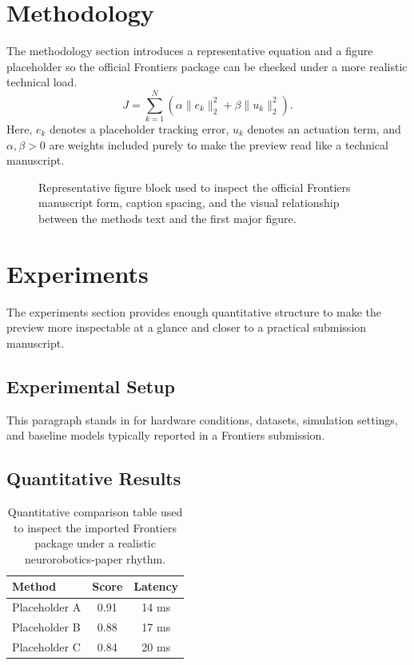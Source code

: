 \documentclass[utf8]{FrontiersinHarvard}
\begin{document}
\section{Methodology}
The methodology section introduces a representative equation and a figure placeholder so the official Frontiers package can be checked under a more realistic technical load.
\begin{equation}
J = \sum_{k=1}^{N} \left( \alpha \lVert e_k \rVert_2^2 + \beta \lVert u_k \rVert_2^2 \right).
\end{equation}
Here, $e_k$ denotes a placeholder tracking error, $u_k$ denotes an actuation term, and $\alpha,\beta > 0$ are weights included purely to make the preview read like a technical manuscript.
\begin{figure}[h]
\centering
{}
\caption{Representative figure block used to inspect the official Frontiers manuscript form, caption spacing, and the visual relationship between the methods text and the first major figure.}
\end{figure}
\section{Experiments}
The experiments section provides enough quantitative structure to make the preview more inspectable at a glance and closer to a practical submission manuscript.
\subsection{Experimental Setup}
This paragraph stands in for hardware conditions, datasets, simulation settings, and baseline models typically reported in a Frontiers submission.
\subsection{Quantitative Results}
\begin{table}[h]
\caption{Quantitative comparison table used to inspect the imported Frontiers package under a realistic neurorobotics-paper rhythm.}
\centering
\begin{tabular}{lcc}
\toprule
Method & Score & Latency \\
\midrule
Placeholder A & 0.91 & 14 ms \\
Placeholder B & 0.88 & 17 ms \\
Placeholder C & 0.84 & 20 ms \\
\bottomrule
\end{tabular}
\end{table}
\end{document}

